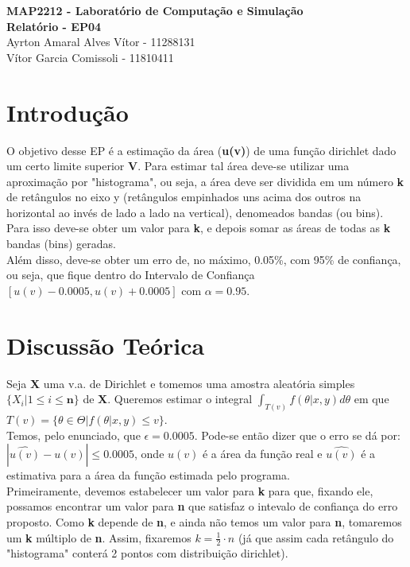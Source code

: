 \documentclass{article}
\begin{document}
\begin{center}
    \textbf{\LARGE MAP2212 - Laboratório de Computação e Simulação}\\
    \vspace{0.3cm}
    \textbf{\Large Relatório - EP04}\\
    \vspace{0.3cm}
    \large{Ayrton Amaral Alves Vítor - 11288131}\\
    \large{Vítor Garcia Comissoli - 11810411}
\end{center}

\section{Introdução}

    O objetivo desse EP é a estimação da área (\textbf{u(v)}) de uma função dirichlet dado um certo limite superior \textbf{V}. Para estimar tal área deve-se utilizar uma aproximação por "histograma", ou seja, a área deve ser dividida em um número \textbf{k} de retângulos no eixo y (retângulos empinhados uns acima dos outros na horizontal ao invés de lado a lado na vertical), denomeados bandas (ou bins). Para isso deve-se obter um valor para \textbf{k}, e depois somar as áreas de todas as \textbf{k} bandas (bins) geradas.\\
    
    Além disso, deve-se obter um erro de, no máximo, 0.05\%, com 95\% de confiança, ou seja, que fique dentro do Intervalo de Confiança $[u(v) - 0.0005, u(v) + 0.0005]$ com $\alpha=0.95$.
    
\section{Discussão Teórica}

    Seja \textbf{X} uma v.a. de Dirichlet e tomemos uma amostra aleatória simples $\{X_i | 1\leq i \leq \textbf{n}\}$ de \textbf{X}. Queremos estimar o integral $\int_{T(v)}f(\theta|x,y)d\theta$ em que $T(v) = \{\theta\in\Theta |f(\theta|x, y)\leq v\}$.\\

    Temos, pelo enunciado, que $\epsilon = 0.0005$. Pode-se então dizer que o erro se dá por: $|\hat{u(v)}-u(v)| \leq 0.0005$, onde $u(v)$ é a área da função real e $\hat{u(v)}$ é a estimativa para a área da função estimada pelo programa.\\

    Primeiramente, devemos estabelecer um valor para \textbf{k} para que, fixando ele, possamos encontrar um valor para \textbf{n} que satisfaz o intevalo de confiança do erro proposto. Como \textbf{k} depende de \textbf{n}, e ainda não temos um valor para \textbf{n}, tomaremos um \textbf{k} múltiplo de \textbf{n}. Assim, fixaremos $k = \frac{1}{2}\cdot n$ (já que assim cada retângulo do "histograma" conterá 2 pontos com distribuição dirichlet).
\end{document}
